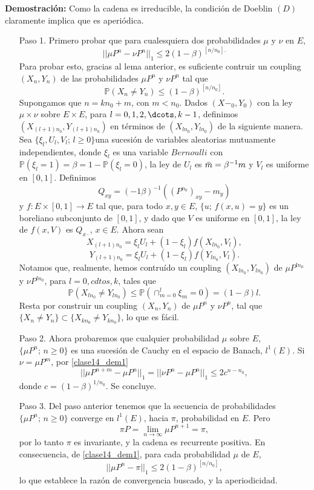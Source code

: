\documentclass[a4paper]{article}
\newcommand{\prob}{\mathbb{P}}
\numberwithin{equation}{subsection}
\begin{document}
\textbf{Demostración: }Como la cadena es irreducible, la condición de Doeblin $(D)$ claramente implica que es aperiódica.
\begin{itemize}
    \item[Paso 1.] Primero probar que para cualesquiera dos probabilidades $\mu$ y $\nu$ en $E$,
    \begin{equation}
        ||\mu P^n - \nu P^n||_1 \leq 2(1-\beta)^{[n/n_0].}
        \label{clase14_dem1}
    \end{equation}
    Para probar esto, gracias al lema anterior, es suficiente contruir un coupling $(X_n,Y_n)$ de las probabilidades $\mu P^n$ y $\nu P^n$ tal que
    \[\prob(X_n \neq Y_n) \leq (1-\beta)^{[n/n_0]}.\]
    Supongamos que  $n = kn_0 + m$, con $m<n_0$. Dados $(X-_0,Y_0)$ con la ley $\mu \times \nu$ sobre $E\times E$, para $l = 0,1,2,\dcots,k-1$, definimos $(X_{(l+1)n_0},Y_{(l+1)n_0})$ en términos de $(X_{ln_0},Y_{ln_0})$ de la siguiente manera. Sea $\{\xi_l , U_l, V_l;\,l\geq 0\}$una sucesión de variables aleatorias mutuamente independientes, donde $\xi_l$ es una variable $Bernoulli$ con $\prob(\xi_l = 1)=\beta = 1 -\prob(\xi_l = 0)$, la ley de $U_l$ es $\Bar{m} = \beta^{-1}m$ y $V_l$ es uniforme en $[0,1]$. Definimos
    \[Q_{xy} = (-1\beta)^{-1}((P^{n_0})_{xy}-m_y)\]
    y $f:E\times [0,1] \rightarrow E$ tal que, para todo $x,y\in E$, $\{u;\,f(x,u)=y\}$ es un boreliano subconjunto de $[0,1]$, y dado que $V$ es uniforme en $[0,1]$, la ley de $f(x,V)$ es $Q_{x\cdot}$, $x\in E$. Ahora sean
    \[X_{(l+1)n_0} = \xi_l U_l + (1-\xi_l)f(X_{ln_0},V_l),\]
    \[Y_{(l+1)n_0} = \xi_l U_l + (1-\xi_l)f(Y_{ln_0},V_l).\]
    Notamos que, realmente, hemos contruído un coupling $(X_{ln_0},Y_{ln_0})$ de $\mu P^{ln_0}$ y $\nu P^{ln_0}$, para $l=0,cdtos,k$, tales que
    \[\prob(X_{ln_0} \neq Y_{ln_0}) \leq  \prob(\cap_{m=0}^l \xi_m =0) = (1-\beta)l.\]
    Resta por construir un coupling $(X_n,Y_n)$ de $\mu P^n$ y $\nu P^n$, tal que $\{X_n \neq Y_n\} \subset \{X_{kn_0} \neq Y_{kn_0}\}$, lo  que es fácil.
    \item[Paso 2.] Ahora probaremos que cualquier probabilidad $\mu$ sobre $E$, $\{\mu P^n;\,n\geq 0\}$ es una sucesión de Cauchy en el espacio de Banach, $l^1(E)$. Si $\nu = \mu P^m$, por \ref{clase14_dem1} 
    \[||\mu P^{n+m}-\mu P^n||_1 = ||\nu P^n - \mu P^n||_1 \leq 2c^{n-n_0},\]
    donde $c=(1-\beta)^{1/n_0}$. Se concluye.
    \item[Paso 3.] Del paso anterior tenemos que la secuencia de probabilidades $\{\mu P^n;\,n\geq 0\}$ converge en $l^1(E)$, hacia $\pi$, probabilidad en $E$. Pero
    \[\pi P = \lim_{n\rightarrow \infty}\mu P^{n+1} = \pi,\]
    por lo tanto $\pi$ es invariante, y la cadena es recurrente positiva. En consecuencia, de \ref{clase14_dem1}, para cada probabilidad $\mu$ de $E$,
    \[||\mu P^n - \pi||_1 \leq 2(1-\beta)^{[n/n_0]},\]
    lo que establece la razón de convergencia buscado, y la aperiodicidad.
\end{itemize}
\end{document}
